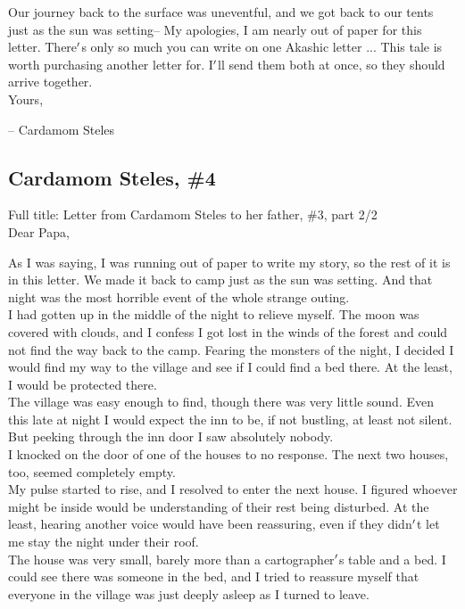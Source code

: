 \documentclass[12pt]{article}
\begin{document}
  
    Our journey back to the surface was uneventful, and we got back to our tents just as the sun was setting-- My apologies, I am nearly out of paper for this letter. There$\rq$s only so much you can write on one Akashic letter ... This tale is worth purchasing another letter for. I$\rq$ll send them both at once, so they should arrive together.\\Yours,

-- Cardamom Steles\\

\newpage

\label{sec:lore/cardamom4}
\subsection*{Cardamom Steles, \#4}


  
    Full title: Letter from Cardamom Steles to her father, \#3, part 2/2\\Dear Papa,

As I was saying, I was running out of paper to write my story, so the rest of it is in this letter. We made it back to camp just as the sun was setting. And that night was the most horrible event of the whole strange outing.\\


  
    I had gotten up in the middle of the night to relieve myself. The moon was covered with clouds, and I confess I got lost in the winds of the forest and could not find the way back to the camp. Fearing the monsters of the night, I decided I would find my way to the village and see if I could find a bed there. At the least, I would be protected there.\\


  
    The village was easy enough to find, though there was very little sound. Even this late at night I would expect the inn to be, if not bustling, at least not silent. But peeking through the inn door I saw absolutely nobody.\\I knocked on the door of one of the houses to no response. The next two houses, too, seemed completely empty.\\


  
    My pulse started to rise, and I resolved to enter the next house. I figured whoever might be inside would be understanding of their rest being disturbed. At the least, hearing another voice would have been reassuring, even if they didn$\rq$t let me stay the night under their roof.\\The house was very small, barely more than a cartographer$\rq$s table and a bed. I could see there was someone in the bed, and I tried to reassure myself that everyone in the village was just deeply asleep as I turned to leave.\\
\end{document}
